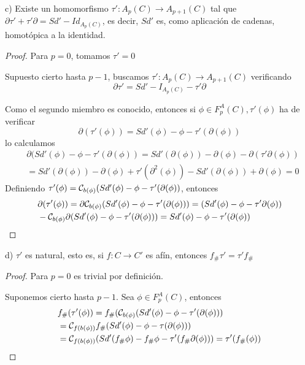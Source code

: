 c) Existe un homomorfismo $\tau' \colon A_p(C) \to A_{p+1}(C)$ tal que ${\partial \tau' + \tau' \partial = Sd' - Id_{A_p(C)}}$,
es decir, $Sd'$ es, como aplicación de cadenas, homotópica a la identidad.

\begin{proof}
  Para $p = 0$, tomamos $\tau' = 0$

  Supuesto cierto hasta $p-1$, buscamos $\tau' \colon A_p(C) \to A_{p+1}(C)$ verificando
  \[\partial \tau' = Sd' - I_{A_p(C)} - \tau' \partial\]

  Como el segundo miembro es conocido, entonces si $\phi \in F_p^A(C), \tau'(\phi)$ ha de verificar
  \[\partial(\tau'(\phi)) = Sd'(\phi) - \phi - \tau'(\partial(\phi))\]
  lo calculamos
  \begin{align*}
    &\partial(Sd'(\phi) - \phi - \tau'(\partial(\phi)) = Sd'(\partial(\phi)) - \partial(\phi) - \partial(\tau' \partial(\phi)) \\
    &= Sd'(\partial(\phi)) - \partial(\phi) + \tau'(\partial^2(\phi)) - Sd'(\partial(\phi)) + \partial(\phi) = 0
  \end{align*}
  Definiendo $\tau'(\phi) = {\mathcal C}_{b(\phi)}(Sd'(\phi) - \phi - \tau'(\partial(\phi))$, entonces
  \begin{align*}
    &\partial(\tau'(\phi)) = \partial {\mathcal C}_{b(\phi)}(Sd'(\phi) - \phi -\tau'(\partial(\phi))) = (Sd'(\phi) - \phi - \tau' \partial(\phi)) \\
    &- {\mathcal C}_{b(\phi)} \partial(Sd'(\phi) - \phi - \tau'(\partial(\phi))) = Sd'(\phi) - \phi - \tau'(\partial(\phi))
  \end{align*}
\end{proof}

d) $\tau'$ es natural, esto es, si $f \colon C \to C'$ es afín, entonces $f_\# \tau' = \tau' f_\#$

\begin{proof}
  Para $p = 0$ es trivial por definición.

  Suponemos cierto hasta $p-1$. Sea $\phi \in F_p^A(C)$, entonces
  \begin{align*}
    &f_\#(\tau'(\phi)) = f_\#({\mathcal C}_{b(\phi)}(Sd'(\phi) - \phi - \tau'(\partial(\phi))) \\
    &= {\mathcal C}_{f(b(\phi))} f_\#(Sd'(\phi) - \phi - \tau(\partial(\phi))) \\
    &= {\mathcal C}_{f(b(\phi))}(Sd'(f_\# \phi) - f_\# \phi - \tau'(f_\# \partial(\phi))) = \tau'(f_\#(\phi))
  \end{align*}
\end{proof}

